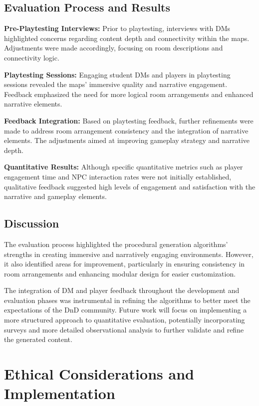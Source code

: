 \documentclass[10pt,twocolumn]{article}
\begin{document}
\subsection{Evaluation Process and Results}

\textbf{Pre-Playtesting Interviews:} Prior to playtesting, interviews with DMs highlighted concerns regarding content depth and connectivity within the maps. Adjustments were made accordingly, focusing on room descriptions and connectivity logic.

\textbf{Playtesting Sessions:} Engaging student DMs and players in playtesting sessions revealed the maps' immersive quality and narrative engagement. Feedback emphasized the need for more logical room arrangements and enhanced narrative elements.

\textbf{Feedback Integration:} Based on playtesting feedback, further refinements were made to address room arrangement consistency and the integration of narrative elements. The adjustments aimed at improving gameplay strategy and narrative depth.

\textbf{Quantitative Results:} Although specific quantitative metrics such as player engagement time and NPC interaction rates were not initially established, qualitative feedback suggested high levels of engagement and satisfaction with the narrative and gameplay elements.

\subsection{Discussion}

The evaluation process highlighted the procedural generation algorithms' strengths in creating immersive and narratively engaging environments. However, it also identified areas for improvement, particularly in ensuring consistency in room arrangements and enhancing modular design for easier customization.

The integration of DM and player feedback throughout the development and evaluation phases was instrumental in refining the algorithms to better meet the expectations of the DnD community. Future work will focus on implementing a more structured approach to quantitative evaluation, potentially incorporating surveys and more detailed observational analysis to further validate and refine the generated content.

\section{Ethical Considerations and Implementation}
\end{document}
